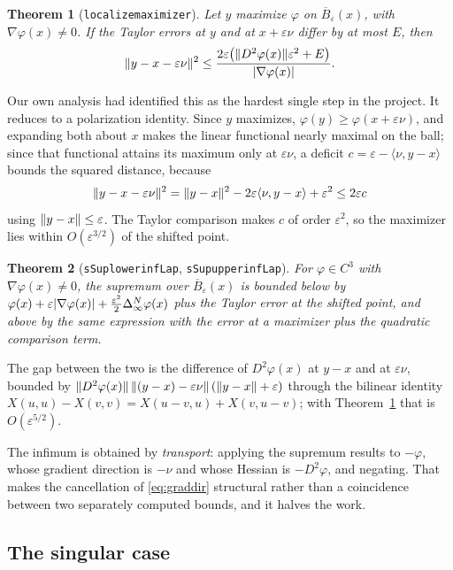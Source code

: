 \documentclass[11pt,reqno]{amsart}
\newcommand{\LEANREF}[1]{\texttt{\small\def\_{\textunderscore\allowbreak}#1}}
\newcommand{\eps}{\varepsilon}
\newcommand{\inflap}{\Delta_\infty^{N}}
\DeclarePairedDelimiter{\abs}{\lvert}{\rvert}
\DeclarePairedDelimiter{\norm}{\lVert}{\rVert}
\theoremstyle{plain}
\newtheorem{theorem}{Theorem}[section]
\theoremstyle{definition}
\begin{document}
\begin{theorem}[\LEANREF{localize\_maximizer}]\label{thm:localize}
Let $y$ maximize $\varphi$ on $\overline{B}_\eps(x)$, with
$\nabla\varphi(x) \ne 0$. If the Taylor errors at $y$ and at $x+\eps\nu$ differ
by at most $E$, then
\[
  \norm{y - x - \eps\nu}^2
  \le \frac{2\eps\bigl(\norm{D^2\varphi(x)}\eps^2 + E\bigr)}
           {\abs{\nabla\varphi(x)}} .
\]
\end{theorem}

Our own analysis had identified this as the hardest single step in the
project. It reduces to a polarization identity. Since $y$ maximizes,
$\varphi(y) \ge \varphi(x+\eps\nu)$, and expanding both about $x$ makes the
linear functional nearly maximal on the ball; since that functional attains
its maximum only at $\eps\nu$, a deficit $c = \eps - \langle\nu, y-x\rangle$
bounds the squared distance, because
\[
  \norm{y - x - \eps\nu}^2
  = \norm{y-x}^2 - 2\eps\langle\nu, y-x\rangle + \eps^2
  \le 2\eps c
\]
using $\norm{y-x} \le \eps$. The Taylor comparison makes $c$ of order
$\eps^2$, so the maximizer lies within $O(\eps^{3/2})$ of the shifted point.

\begin{theorem}[\LEANREF{sSup\_lower\_infLap},
\LEANREF{sSup\_upper\_infLap}]\label{thm:extexp}
For $\varphi \in C^3$ with $\nabla\varphi(x) \ne 0$, the supremum over
$\overline{B}_\eps(x)$ is bounded below by
$\varphi(x) + \eps\abs{\nabla\varphi(x)}
  + \tfrac{\eps^2}{2}\inflap\varphi(x)$ plus the Taylor error at the shifted
point, and above by the same expression with the error at a maximizer plus
the quadratic comparison term.
\end{theorem}

The gap between the two is the difference of $D^2\varphi(x)$ at $y-x$ and at
$\eps\nu$, bounded by $\norm{D^2\varphi(x)}\,\norm{(y-x)-\eps\nu}\,
(\norm{y-x}+\eps)$ through the bilinear identity
$X(u,u) - X(v,v) = X(u-v,u) + X(v,u-v)$; with
Theorem~\ref{thm:localize} that is $O(\eps^{5/2})$.

The infimum is obtained by \emph{transport}: applying the supremum results to
$-\varphi$, whose gradient direction is $-\nu$ and whose Hessian is
$-D^2\varphi$, and negating. That makes the cancellation of
\eqref{eq:graddir} structural rather than a coincidence between two separately
computed bounds, and it halves the work.

\subsection{The singular case}
\end{document}
